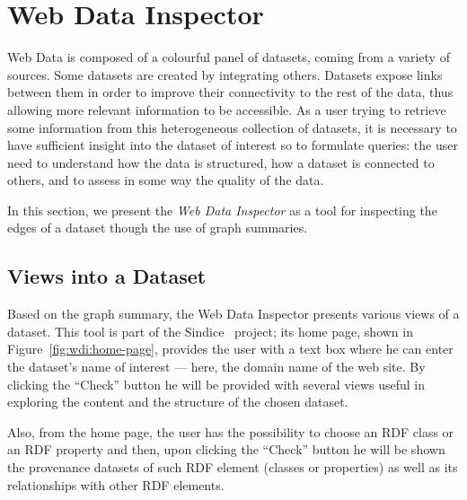 \section{Web Data Inspector}
\label{sec:web-data-inspector}

Web Data is composed of a colourful panel of datasets, coming from a variety of sources. Some datasets are created by integrating others. Datasets expose links between them in order to improve their connectivity to the rest of the data, thus allowing more relevant information to be accessible. As a user trying to retrieve some information from this heterogeneous collection of datasets, it is necessary to have sufficient insight into the dataset of interest so to formulate queries: the user need to understand how the data is structured, how a dataset is connected to others, and to assess in some way the quality of the data.

In this section, we present the \emph{Web Data Inspector} as a tool for inspecting the edges of a dataset though the use of graph summaries.

\subsection{Views into a Dataset}

Based on the graph summary, the Web Data Inspector presents various views of a dataset. This tool is part of the Sindice~\cite{oren:2008:sdl} project; its home page, shown in Figure~\ref{fig:wdi:home-page}, provides the user with a text box where he can enter the dataset's name of interest --- here, the domain name of the web site. By clicking the ``Check'' button he will be provided with several views useful in exploring the content and the structure of the chosen dataset.

Also, from the home page, the user has the possibility to choose an RDF class or an RDF property and then, upon clicking the ``Check'' button he will be shown the provenance datasets of such RDF element (classes or properties) as well as its relationships with other RDF elements.

